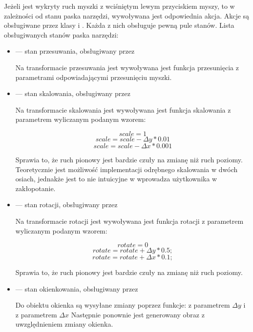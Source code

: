 \par
Jeżeli jest wykryty ruch myszki z wciśniętym lewym przyciskiem myszy, to w zależności od stanu paska narzędzi, wywoływana jest odpowiednia akcja.
Akcje są obsługiwane przez klasy  i .
Każda z nich obsługuje pewną pule stanów.
Lista obsługiwanych stanów paska narzędzi:
\begin{itemize}
    \item {} --- stan przesuwania, obsługiwany przez 

          Na transformacie przesuwania jest wywoływana jest funkcja przesunięcia  z parametrami odpowiadającymi przesunięciu myszki.

    \item {} --- stan skalowania, obsługiwany przez 

          Na transformacie skalowania jest wywoływana jest funkcja skalowania  z parametrem  wyliczanym podanym wzorem:

          \[scale=1\]
          \[scale=scale-{\Delta}y*0.01\]
          \[scale=scale-{\Delta}x*0.001\]

          Sprawia to, że ruch pionowy jest bardzie czuły na zmianę niż ruch poziomy.
          Teoretycznie jest możliwość implementacji odrębnego skalowania w dwóch osiach, jednakże jest to nie intuicyjne w wprowadza użytkownika w zakłopotanie.

    \item {} --- stan rotacji, obsługiwany przez 

          Na transformacie rotacji jest wywoływana jest funkcja rotacji  z parametrem  wyliczanym podanym wzorem:

          \[rotate = 0\]
          \[rotate = rotate + {\Delta}y * 0.5;\]
          \[rotate = rotate + {\Delta}x * 0.1;\]

          Sprawia to, że ruch pionowy jest bardzie czuły na zmianę niż ruch poziomy.

    \item {} --- stan okienkowania, obsługiwany przez 

          Do obiektu okienka są wysyłane zmiany poprzez funkcje:  z parametrem ${\Delta}y$ i  z parametrem ${\Delta}x$
          Następnie ponownie jest generowany obraz z uwzględnieniem zmiany okienka.

\end{itemize}